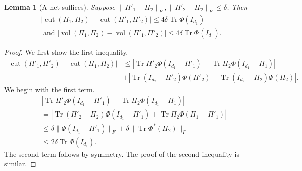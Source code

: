 \documentclass{article}
\newtheorem{lemma}[theorem]{Lemma}
\newcommand{\cut}{\operatorname{cut}}
\newcommand{\vol}{\operatorname{vol}}
\newcommand\tr{\operatorname{Tr}}
\begin{document}
\begin{lemma}[A net suffices]\label{lem:net-suffices}
Suppose $\|\Pi'_1 -\Pi_2\|_F, \|\Pi'_2 - \Pi_2\|_F \leq \delta$. Then
\begin{align*} |\cut(\Pi_1, \Pi_2) - \cut(\Pi'_1, \Pi'_2)| \leq4\delta \tr \Phi(I_{d_1})\\
\textrm{ and }|\vol(\Pi_1, \Pi_2) - \vol(\Pi'_1, \Pi'_2)| \leq 4\delta \tr \Phi(I_{d_1}).
\end{align*}
\end{lemma}
\begin{proof}
We first show the first inequality.
\begin{align*}|\cut(\Pi'_1, \Pi'_2) - \cut(\Pi_1, \Pi_2)| & \leq |\tr \Pi'_2 \Phi(I_{d_1} - \Pi'_1) - \tr \Pi_2 \Phi(I_{d_1} - \Pi_1)|\\
&  + |\tr (I_{d_2} - \Pi'_2) \Phi(\Pi'_2) - \tr (I_{d_2} - \Pi_2) \Phi(\Pi_2)|.
\end{align*}
We begin with the first term.
\begin{align*}&|\tr \Pi'_2 \Phi(I_{d_1} - \Pi'_1) - \tr \Pi_2 \Phi(I_{d_1} - \Pi_1)|\\
&= |\tr (\Pi'_2 - \Pi_2) \Phi(I_{d_1} - \Pi'_1) + \tr \Pi_2 \Phi(\Pi_1 - \Pi'_1)|\\
&\leq \delta\| \Phi(I_{d_1} - \Pi'_1)\|_F + \delta\| \tr \Phi^*(\Pi_2)\|_F\\
& \leq 2 \delta \tr \Phi(I_{d_1}).
\end{align*}
The second term follows by symmetry. The proof of the second inequality is similar.
\end{proof}
\end{document}
